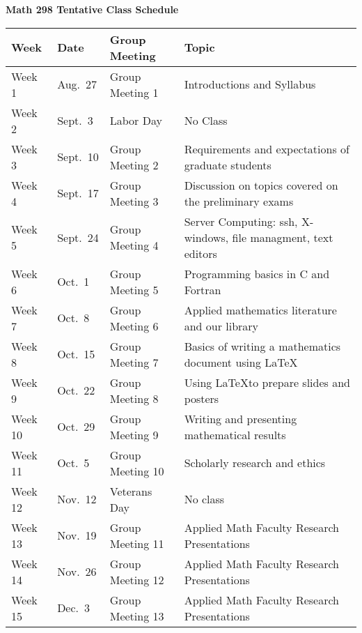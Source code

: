\documentclass{article}
\begin{document}
\clearpage

\begin{center}

{\bf Math 298 Tentative Class Schedule}

\bigskip

\begin{tabular}{|l|l|l|l|}

  \hline

  {\bf Week} & {\bf Date} & {\bf Group Meeting} & {\bf Topic}\\

  \hline \hline

  Week 1 & Aug.~27  & Group Meeting 1  & Introductions and Syllabus\\
  \hline
  Week 2 & Sept.~3  & Labor Day  & No Class \\
  \hline

  Week 3 & Sept.~10 & Group Meeting 2  & Requirements and expectations
  of graduate students\\
  \hline

  Week 4 & Sept.~17 & Group Meeting 3 & Discussion on topics covered
  on the preliminary exams\\
  \hline

  Week 5 & Sept.~24 & Group Meeting 4 & Server Computing: ssh,
  X-windows, file managment, text editors\\
  \hline

  Week 6 & Oct.~1   & Group Meeting 5 & Programming basics in C and
  Fortran\\
  \hline

  Week 7 & Oct.~8   & Group Meeting 6 & Applied
  mathematics literature and our library\\
  \hline

  Week 8 & Oct.~15  & Group Meeting 7 & Basics of writing a
  mathematics document using \LaTeX\\
  \hline

  Week 9 & Oct.~22  & Group Meeting 8 & Using \LaTeX to prepare
  slides and posters\\
  \hline

  Week 10 & Oct.~29  & Group Meeting 9 & Writing and presenting
  mathematical results\\
  \hline

  Week 11 & Oct.~5   & Group Meeting 10 & Scholarly research and
  ethics\\
  \hline

  Week 12 & Nov.~12  & Veterans Day & No class \\
  \hline

  Week 13 & Nov.~19  & Group Meeting 11 & Applied Math Faculty
  Research Presentations\\
  \hline

  Week 14 & Nov.~26  & Group Meeting 12 & Applied Math Faculty
  Research Presentations\\
  \hline

  Week 15 & Dec.~3   & Group Meeting 13 & Applied Math Faculty
  Research Presentations\\

  \hline

\end{tabular}

\end{center}
\end{document}
